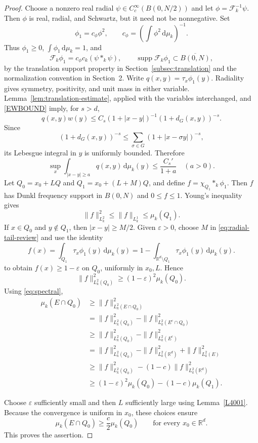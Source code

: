 \documentclass[12pt]{article}
\DeclareMathOperator{\supp}{supp}
\begin{document}
\begin{proof}
Choose a nonzero real radial $\psi\in C_c^\infty(B(0,N/2))$ and let $\phi=\mathcal{F}_k^{-1}\psi$. Then $\phi$ is real, radial, and Schwartz, but it need not be nonnegative. Set
\[
\phi_1=c_\phi\phi^2,\qquad c_\phi=\left(\int\phi^2\,\mathrm{d}\mu_k\right)^{-1}.
\]
Thus $\phi_1\ge0$, $\int\phi_1\,\mathrm{d}\mu_k=1$, and
\[
\mathcal{F}_k\phi_1=c_\phi c_k(\psi*_k\psi),\qquad
\supp\mathcal{F}_k\phi_1\subset \overline{B(0,N)},
\]
by the translation support property in Section~\ref{subsec:translation} and the normalization convention in Section~2.
Write $q(x,y)=\tau_x\phi_1(y)$. Radiality gives symmetry, positivity, and unit mass in either variable. Lemma~\ref{lem:translation-estimate}, applied with the variables interchanged, and \eqref{EWBOUND} imply, for $s>d$,
\[
q(x,y)w(y)\le C_s(1+|x-y|)^{-1}(1+d_G(x,y))^{-s}.
\]
Since
\[
(1+d_G(x,y))^{-s}\le\sum_{\sigma\in G}(1+|x-\sigma y|)^{-s},
\]
its Lebesgue integral in $y$ is uniformly bounded. Therefore
\begin{equation}\label{eq:radial-tail-review}
\sup_x\int_{|x-y|\ge a}q(x,y)\,\mathrm{d}\mu_k(y)\le\frac{C_s'}{1+a}\quad(a>0).
\end{equation}
Let $Q_0=x_0+LQ$ and $Q_1=x_0+(L+M)Q$, and define $f=\chi_{Q_1}*_k\phi_1$. Then $f$ has Dunkl frequency support in $B(0,N)$ and $0\le f\le1$. Young's inequality gives
\begin{equation}\label{E2}
\|f\|_{L_k^2}^2\le\|f\|_{L_k^1}\le\mu_k(Q_1).
\end{equation}
If $x\in Q_0$ and $y\notin Q_1$, then $|x-y|\ge M/2$. Given $\varepsilon>0$, choose $M$ in \eqref{eq:radial-tail-review}
and use the identity
\[
f(x) = \int_{Q_1} \tau_x \phi_1(y)\,\mathrm{d}\mu_k(y)
= 1 - \int_{\mathbb{R}^d \setminus Q_1} \tau_x \phi_1(y)\,\mathrm{d}\mu_k(y).
\]
to obtain $f(x)\ge1-\varepsilon$ on $Q_0$, uniformly in $x_0,L$. Hence
\begin{equation}\label{E3}
\|f\|_{L_k^2(Q_0)}^2\ge(1-\varepsilon)^2\mu_k(Q_0).
\end{equation}
Using \eqref{eq:spectral},
\begin{align*}
\mu_k(E\cap Q_0) &\ge \|f\|_{L_k^2(E\cap Q_0)}^2 \\
&= \|f\|_{L_k^2(Q_0)}^2 - \|f\|_{L_k^2(E^c\cap Q_0)}^2 \\
&\ge \|f\|_{L_k^2(Q_0)}^2 - \|f\|_{L_k^2(E^c)}^2 \\
&= \|f\|_{L_k^2(Q_0)}^2 - \|f\|_{L_k^2(\mathbb{R}^d)}^2 + \|f\|_{L_k^2(E)}^2 \\
&\ge \|f\|_{L_k^2(Q_0)}^2 - (1-c)\|f\|_{L_k^2(\mathbb{R}^d)}^2\\
&\ge(1-\varepsilon)^2\mu_k(Q_0)-(1-c)\mu_k(Q_1).
\end{align*}

Choose $\varepsilon$ sufficiently small and then $L$ sufficiently large using Lemma~\ref{L4001}. Because the convergence is uniform in $x_0$, these choices ensure
\[
\mu_k(E\cap Q_0)\ge\frac c2\mu_k(Q_0)\qquad\text{for every }x_0\in\mathbb{R}^d.
\]
This proves the assertion.
\end{proof}
\end{document}
